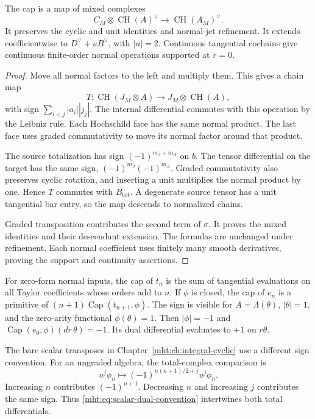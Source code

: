 \begin{theorem}\label{mht:thm:supported-cyclic-cap}
The cap is a map of mixed complexes
\[
 C_M\otimes\operatorname{CH}(A)^\vee
       \longrightarrow\operatorname{CH}(A_M)^\vee.
\]
It preserves the cyclic and unit identities and normal-jet
refinement. It extends coefficientwise to $D^\vee+uB^\vee$,
with $|u|=2$. Continuous tangential cochains give continuous
finite-order normal operations supported at $r=0$.
\end{theorem}
\begin{proof}
Move all normal factors to the left and multiply them.
This gives a chain map
\[
 T:\operatorname{CH}(J_M\otimes A)\longrightarrow
                                      J_M\otimes\operatorname{CH}(A),
\]
with sign $\sum_{i<j}|a_i||j_j|$. The internal differential
commutes with this operation by the Leibniz rule.
Each Hochschild face has the same normal product.
The last face uses graded commutativity to move its normal
factor around that product.

The source totalization has sign $(-1)^{m_J+m_A}$ on $b$.
The tensor differential on the target has the same sign,
$(-1)^{m_J}(-1)^{m_A}$. Graded commutativity also preserves
cyclic rotation, and inserting a unit multiplies the normal
product by one. Hence $T$ commutes with $B_{\mathrm{tot}}$.
A degenerate source tensor has a unit tangential bar entry,
so the map descends to normalized chains.

Graded transposition contributes the second term of $\sigma$.
It proves the mixed identities and their descendant extension.
The formulas are unchanged under refinement. Each normal
coefficient uses finitely many smooth derivatives, proving
the support and continuity assertions.
\end{proof}

For zero-form normal inputs, the cap of $t_n$ is the sum
of tangential evaluations on all Taylor coefficients whose
orders add to $n$. If $\phi$ is closed, the cap of $e_n$
is a primitive of $(n+1)\operatorname{Cap}(t_{n+1},\phi)$.
The sign is visible for $A=\Lambda(\theta)$, $|\theta|=1$,
and the zero-arity functional $\phi(\theta)=1$.
Then $|\phi|=-1$ and
$\operatorname{Cap}(e_0,\phi)(dr\,\theta)=-1$.
Its dual differential evaluates to $+1$ on $r\theta$.

The bare scalar transposes in Chapter~\ref{mht:ch:integral-cyclic}
use a different sign convention. For an ungraded algebra,
the total-complex comparison is
\begin{equation}\label{mht:eq:scalar-dual-convention}
 u^j\phi_n\longmapsto
             (-1)^{n(n+1)/2+j}u^j\phi_n.
\end{equation}
Increasing $n$ contributes $(-1)^{n+1}$.
Decreasing $n$ and increasing $j$ contributes the same sign.
Thus \eqref{mht:eq:scalar-dual-convention} intertwines both
total differentials.


